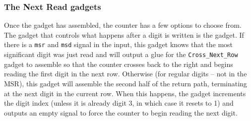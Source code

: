 \subsubsection{ The Next Read gadgets }

Once the {\returnpath} gadget has assembled, the counter has
a few options to choose from. The gadget that controls what happens after a digit is
written is the {\nextread} gadget. If there is a {\tt msr} and {\tt msd} signal in
the input, this gadget knows that the most significant digit was just read and will output a
glue for the {\tt Cross\_Next\_Row} gadget to assemble so that the counter crosses
back to the right and begins reading the first digit in the next row. Otherwise
(for regular digits -- not in the MSR), this gadget will assemble the second half of
the return path, terminating at the next digit in the current row. When this happens,
the gadget increments the digit index (unless it is already digit 3, in which case it
resets to 1) and outputs an empty {\cread} signal to force the counter to begin reading
the next digit.



